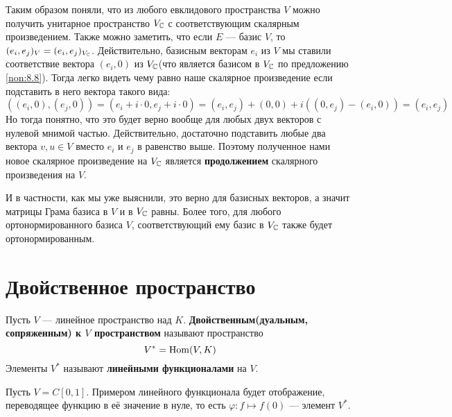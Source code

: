 \documentclass[../main.tex]{subfiles}
\begin{document}
Таким образом поняли, что из любого евклидового пространства $V$ можно получить унитарное пространство $V_{\mathbb{C}}$ с соответствующим скалярным произведением. Также можно заметить, что если $E$ --- базис $V$, то $(e_i, e_j)_V = (e_i, e_j)_{V_{\mathbb{C}}}$. Действительно, базисным векторам $e_i$ из $V$ мы ставили соответствие вектора $(e_i, 0)$ из $V_{\mathbb{C}}$(что является базисом в $V_{\mathbb{C}}$ по предложению \ref{non:8.8}). Тогда легко видеть чему равно наше скалярное произведение если подставить в него вектора такого вида:
\begin{equation*}
  ((e_i, 0), (e_j, 0)) = (e_i + i \cdot 0, e_j + i \cdot 0) =
  (e_i, e_j) + (0, 0) + i((0, e_j) - (e_i, 0)) = (e_i, e_j)
\end{equation*}
Но тогда понятно, что это будет верно вообще для любых двух векторов с нулевой мнимой частью. Действительно, достаточно подставить любые два вектора $v, u \in V$ вместо $e_i$ и $e_j$ в равенство выше. Поэтому полученное нами новое скалярное произведение на $V_{\mathbb{C}}$ является \textbf{продолжением} скалярного произведения на $V$.

И в частности, как мы уже выяснили, это верно для базисных векторов, а значит матрицы Грама базиса в $V$ и в $V_{\mathbb{C}}$ равны. Более того, для любого ортонормированного базиса $V$, соответствующий ему базис в $V_{\mathbb{C}}$ также будет ортонормированным.

\section{Двойственное пространство}

\begin{definition}
  Пусть $V$ --- линейное пространство над $K$. \textbf{Двойственным(дуальным, сопряженным) к $V$ пространством} называют пространство
  \begin{equation*}
    V^{*} = \operatorname{Hom}(V, K)
  \end{equation*}
  Элементы $V^{*}$ называют \textbf{линейными функционалами} на $V$.
\end{definition}

\begin{example}
  Пусть $V = C[0, 1]$. Примером линейного функционала будет отображение, переводящее функцию в её значение в нуле, то есть $\varphi\colon f \mapsto f(0)$ --- элемент $V^{*}$.
\end{example}
\end{document}
